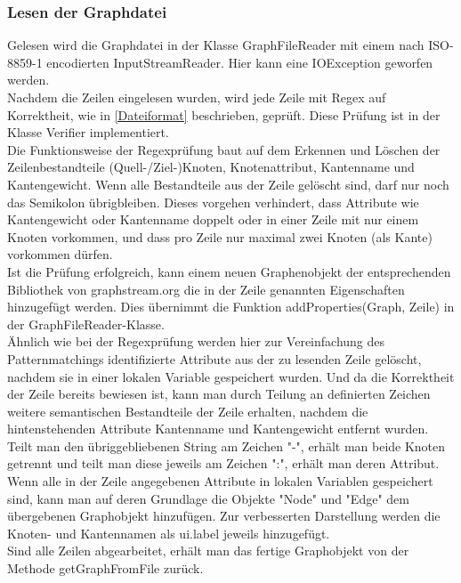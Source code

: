 \documentclass[a4paper]{article}
\begin{document}
\subsubsection{Lesen der Graphdatei}
Gelesen wird die Graphdatei in der Klasse GraphFileReader mit einem nach ISO-8859-1 encodierten InputStreamReader. Hier kann eine IOException geworfen werden.\\
Nachdem die Zeilen eingelesen wurden, wird jede Zeile mit Regex auf Korrektheit, wie in \ref{Dateiformat} beschrieben, geprüft. Diese Prüfung ist in der Klasse Verifier implementiert.\\
Die Funktionsweise der Regexprüfung baut auf dem Erkennen und Löschen der Zeilenbestandteile (Quell-/Ziel-)Knoten, Knotenattribut, Kantenname und Kantengewicht. Wenn alle Bestandteile aus der Zeile gelöscht sind, darf nur noch das Semikolon übrigbleiben. Dieses vorgehen verhindert, dass Attribute wie Kantengewicht oder Kantenname doppelt oder in einer
Zeile mit nur einem Knoten vorkommen, und dass pro Zeile nur maximal zwei Knoten (als Kante) vorkommen dürfen.\\
Ist die Prüfung erfolgreich, kann einem neuen Graphenobjekt der entsprechenden Bibliothek von graphstream.org die in der Zeile genannten Eigenschaften hinzugefügt werden. Dies übernimmt die Funktion addProperties(Graph, Zeile) in der GraphFileReader-Klasse.\\
Ähnlich wie bei der Regexprüfung werden hier zur Vereinfachung des Patternmatchings identifizierte Attribute aus der zu lesenden Zeile gelöscht, nachdem sie in einer lokalen Variable gespeichert wurden. Und da die Korrektheit der Zeile bereits bewiesen ist, kann man durch Teilung an definierten Zeichen weitere semantischen Bestandteile der Zeile erhalten, nachdem die hintenstehenden Attribute Kantenname und Kantengewicht entfernt wurden. Teilt man den übriggebliebenen String am Zeichen "-", erhält man beide Knoten getrennt und teilt man diese jeweils am Zeichen ":", erhält man deren Attribut.\\
Wenn alle in der Zeile angegebenen Attribute in lokalen Variablen gespeichert sind, kann man auf deren Grundlage die Objekte "Node" und "Edge" dem übergebenen Graphobjekt hinzufügen. Zur verbesserten Darstellung werden die Knoten- und Kantennamen als ui.label jeweils hinzugefügt.\\
Sind alle Zeilen abgearbeitet, erhält man das fertige Graphobjekt von der Methode getGraphFromFile zurück.\\
\end{document}
